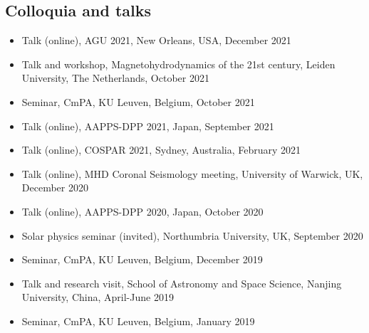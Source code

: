 \subsection*{Colloquia and talks}
\begin{itemize}
  \item[] Talk (online), AGU 2021, New Orleans, USA, December 2021
  \item[] Talk and workshop, Magnetohydrodynamics of the 21st century, Leiden University, The Netherlands, October 2021
  \item[] Seminar, CmPA, KU Leuven, Belgium, October 2021
  \item[] Talk (online), AAPPS-DPP 2021, Japan, September 2021
  \item[] Talk (online), COSPAR 2021, Sydney, Australia, February 2021
  \item[] Talk (online), MHD Coronal Seismology meeting, University of Warwick, UK, December 2020
  \item[] Talk (online), AAPPS-DPP 2020, Japan, October 2020
  \item[] Solar physics seminar (invited), Northumbria University, UK, September 2020
  \item[] Seminar, CmPA, KU Leuven, Belgium, December 2019
  \item[] Talk and research visit, School of Astronomy and Space Science, Nanjing University, China, April-June 2019
  \item[] Seminar, CmPA, KU Leuven, Belgium, January 2019
\end{itemize}









\cleardoublepage
